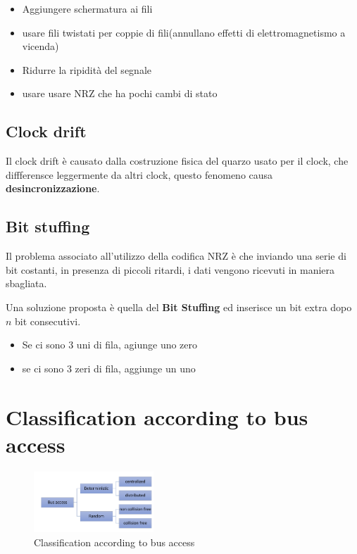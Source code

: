 \begin{itemize}
  \item Aggiungere schermatura ai fili
  \item usare fili twistati per coppie di fili(annullano effetti di elettromagnetismo a vicenda)
  \item Ridurre la ripidità del segnale
  \item usare usare NRZ che ha pochi cambi di stato
\end{itemize}

\subsection{Clock drift}

Il clock drift è causato dalla costruzione fisica del quarzo usato per il clock, che diffferensce leggermente da altri clock, questo fenomeno causa \textbf{desincronizzazione}.
\subsection{Bit stuffing}
Il problema associato all'utilizzo della codifica NRZ è che inviando una serie di bit costanti, in presenza di piccoli ritardi, i dati vengono ricevuti in maniera sbagliata.

Una soluzione proposta è quella del \textbf{Bit Stuffing} ed inserisce un bit extra dopo $n$ bit consecutivi.
\begin{itemize}
  \item Se ci sono 3 uni di fila, agiunge uno zero
  \item se ci sono 3 zeri di fila, aggiunge un uno
\end{itemize}


\section{Classification according to bus access}

\begin{figure}[!ht]
  \centering
  \includegraphics[width=0.4\textwidth]{./images/classification_bus_access.png}
  \caption{Classification according to bus access}
  \label{fig:classification_bus_access}
\end{figure}

